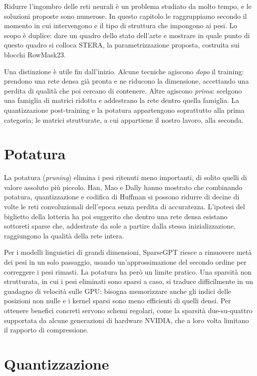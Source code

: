 Ridurre l'ingombro delle reti neurali è un problema studiato da molto tempo, e le soluzioni proposte sono numerose. In questo capitolo le raggruppiamo secondo il momento in cui intervengono e il tipo di struttura che impongono ai pesi. Lo scopo è duplice: dare un quadro dello stato dell'arte e mostrare in quale punto di questo quadro si colloca STERA, la parametrizzazione proposta, costruita sui blocchi RowMask23.

Una distinzione è utile fin dall'inizio. Alcune tecniche agiscono \emph{dopo} il training: prendono una rete densa già pronta e ne riducono la dimensione, accettando una perdita di qualità che poi cercano di contenere. Altre agiscono \emph{prima}: scelgono una famiglia di matrici ridotta e addestrano la rete dentro quella famiglia. La quantizzazione post-training e la potatura appartengono soprattutto alla prima categoria; le matrici strutturate, a cui appartiene il nostro lavoro, alla seconda.

\section{Potatura}

La potatura (\emph{pruning}) elimina i pesi ritenuti meno importanti, di solito quelli di valore assoluto più piccolo. Han, Mao e Dally \cite{han2016deep} hanno mostrato che combinando potatura, quantizzazione e codifica di Huffman si possono ridurre di decine di volte le reti convoluzionali dell'epoca senza perdita di accuratezza. L'ipotesi del biglietto della lotteria \cite{frankle2019lottery} ha poi suggerito che dentro una rete densa esistano sottoreti sparse che, addestrate da sole a partire dalla stessa inizializzazione, raggiungono la qualità della rete intera.

Per i modelli linguistici di grandi dimensioni, SparseGPT \cite{frantar2023sparsegpt} riesce a rimuovere metà dei pesi in un solo passaggio, usando un'approssimazione del secondo ordine per correggere i pesi rimasti. La potatura ha però un limite pratico. Una sparsità non strutturata, in cui i pesi eliminati sono sparsi a caso, si traduce difficilmente in un guadagno di velocità sulle GPU: bisogna memorizzare anche gli indici delle posizioni non nulle e i kernel sparsi sono meno efficienti di quelli densi. Per ottenere benefici concreti servono schemi regolari, come la sparsità due-su-quattro supportata da alcune generazioni di hardware NVIDIA, che a loro volta limitano il rapporto di compressione.

\section{Quantizzazione}

